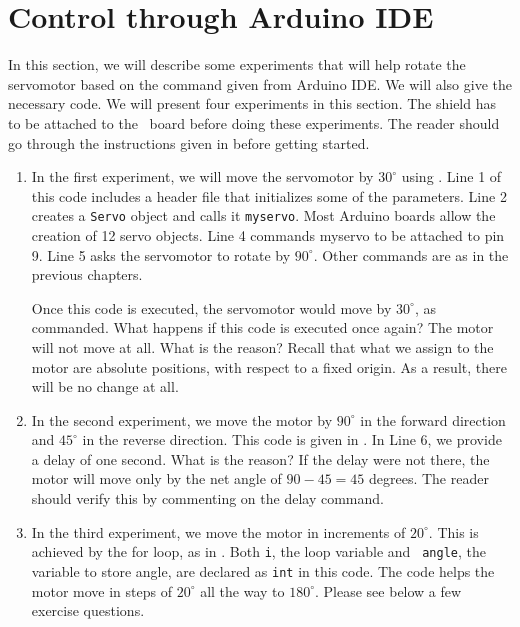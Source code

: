 \section{Control through Arduino IDE}
\label{sec:servo-ard}
In this section, we will describe some experiments that will help
rotate the servomotor based on the command given from Arduino IDE.  We
will also give the necessary code.  We will present four experiments
in this section.  The shield has to be attached to the \arduino\ board
before doing these experiments.  The reader should go through the
instructions given in  before getting started.
\begin{enumerate}
\item In the first experiment, we will move the servomotor by
  $30^\circ$ using .  Line 1 of this code
  includes a header file that initializes some of the parameters.
  Line 2 creates a {\tt Servo} object and calls it {\tt myservo}.
  Most Arduino boards allow the creation of 12 servo objects.  Line 4
  commands myservo to be attached to pin 9.  Line 5 asks the
  servomotor to rotate by $90^\circ$.  Other commands are as in the
  previous chapters.

  Once this code is executed, the servomotor would move by
  $30^\circ$, as commanded.  What happens if this code is executed
  once again?  The motor will not move at all.  What is the reason?
  Recall that what we assign to the motor are absolute positions, with
  respect to a fixed origin.  As a result, there will be no change at
  all. 

\item In the second experiment, we move the motor by $90^\circ$ in the
  forward direction and $45^\circ$ in the reverse direction.  This
  code is given in .  In Line 6, we provide
  a delay of one second.  What is the reason?  If the delay were not
  there, the motor will move only by the net angle of $90-45 = 45$
  degrees.  The reader should verify this by commenting on the delay
  command.

\item In the third experiment, we move the motor in increments of
  $20^\circ$.  This is achieved by the for loop, as in
  .  Both {\tt i}, the loop variable and {\tt
    angle}, the variable to store angle, are declared as {\tt int} in
  this code.  The code helps the motor move in steps of $20^\circ$ all
  the way to $180^\circ$.  Please see below a few exercise questions.


\end{enumerate}
